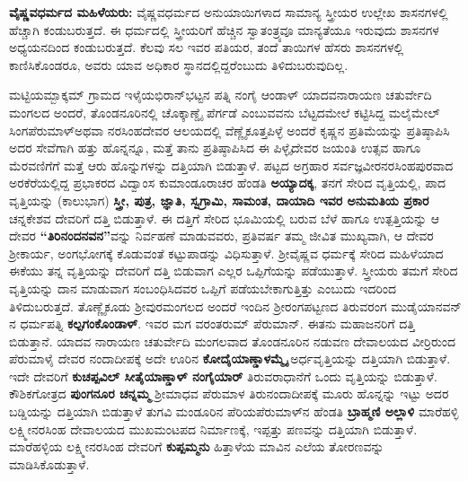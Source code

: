 \textbf{ವೈಷ್ಣವಧರ್ಮದ ಮಹಿಳೆಯರು:} ವೈಷ್ಣವಧರ್ಮದ ಅನುಯಾಯಿಗಳಾದ ಸಾಮಾನ್ಯ ಸ್ತ್ರೀಯರ ಉಲ್ಲೇಖ ಶಾಸನಗಳಲ್ಲಿ ಹೆಚ್ಚಾಗಿ ಕಂಡುಬರುತ್ತದೆ. ಈ ಧರ್ಮದಲ್ಲಿ ಸ್ತ್ರೀಯರಿಗೆ ಹೆಚ್ಚಿನ ಸ್ವಾತಂತ್ರ್ಯವೂ ಮಾನ್ಯತೆಯೂ ಇರುವುದು ಶಾಸನಗಳ ಅಧ್ಯಯನದಿಂದ ಕಂಡುಬರುತ್ತದೆ. ಕೆಲವು ಸಲ ಇವರ ಪತಿಯರ, ತಂದೆ ತಾಯಿಗಳ ಹೆಸರು ಶಾಸನಗಳಲ್ಲಿ ಕಾಣಿಸಿಕೊಂಡರೂ, ಅವರು ಯಾವ ಅಧಿಕಾರ ಸ್ಥಾನದಲ್ಲಿದ್ದರೆಂಬುದು ತಿಳಿದುಬರುವುದಿಲ್ಲ.

ಮಟ್ಟಿಯಮ್ಬಾಕ್ಕಮ್ ಗ್ರಾಮದ ಇಳೈಯಭಿರಾನ್​ಭಟ್ಟನ ಪತ್ನಿ ನಂಗೈ ಆಂಡಾಳ್​ ಯಾದವನಾರಾಯಣ ಚತುರ್ವೇದಿ ಮಂಗಲದ ಅಂದರೆ, ತೊಂಡನೂರಿನಲ್ಲಿ ಚೊಕ್ಕಾಣ್ಡೈ ಪೆರ್ಗಡೆ ಎಂಬುವವನು ಬೆಟ್ಟದಮೇಲೆ ಕಟ್ಟಿಸಿದ್ದ ಮಲೈಮೇಲ್​\break ಸಿಂಗಪೆರುಮಾಳ್​ ಅಥವಾ ನರಸಿಂಹದೇವರ ಆಲಯದಲ್ಲಿ ವೆಣ್ಣೈಕೂತ್ತಪಿಳ್ಳೆ ಅಂದರೆ ಕೃಷ್ಣನ ಪ್ರತಿಮೆಯನ್ನು ಪ್ರತಿಷ್ಠಾಪಿಸಿ ಅದರ ಸೇವೆಗಾಗಿ ಹತ್ತು ಹೊನ್ನನ್ನೂ, ಮತ್ತೆ ತಾನು ಪ್ರತಿಷ್ಠಾಪಿಸಿದ ಈ ಪಿಳ್ಳೈದೇವರ ಜಯಂತಿ ಉತ್ಸವ ಹಾಗೂ ಮೆರವಣಿಗೆಗೆ ಮತ್ತೆ ಆರು ಹೊನ್ನುಗಳನ್ನು ದತ್ತಿಯಾಗಿ ಬಿಡುತ್ತಾಳೆ. ಪಟ್ಟದ ಅಗ್ರಹಾರ ಸರ್ವಜ್ಞವೀರನರಸಿಂಹಪುರವಾದ ಅರಕೆರೆಯಲ್ಲಿದ್ದ ಪ್ರಭಾಕರದ ವಿದ್ವಾಂಸ ಕುಮಾಂಡೂರಾಚರ ಹೆಂಡತಿ \textbf{ಅಯ್ಯಾದಕ್ಕ}, ತನಗೆ ಸೇರಿದ ವೃತ್ತಿಯಲ್ಲಿ, ಪಾದ ವೃತ್ತಿಯನ್ನು (ಕಾಲುಭಾಗ) \textbf{ಸ್ತ್ರೀ, ಪುತ್ರ, ಜ್ಞಾತಿ, ಸ್ವಗ್ರಾಮಿ, ಸಾಮಂತ, ದಾಯಾದಿ ಇವರ ಅನುಮತಿಯ ಪ್ರಕಾರ} ಚನ್ನಕೇಶವ ದೇವರಿಗೆ ದತ್ತಿ ಬಿಡುತ್ತಾಳೆ. ಈ ದತ್ತಿಗೆ ಸೇರಿದ ಭೂಮಿಯಲ್ಲಿ ಬರುವ ಬೆಳೆ ಹಾಗೂ ಉತ್ಪತ್ತಿಯನ್ನು ಆ ದೇವರ \textbf{“ತಿರಿನಂದನವನ”}ವನ್ನು ನಿರ್ವಹಣೆ ಮಾಡುವವರು, ಪ್ರತಿವರ್ಷ ತಮ್ಮ ಜೀವಿತ ಮುಖ್ಯವಾಗಿ, ಆ ದೇವರ ಶ‍್ರೀಕಾರ್ಯ, ಅಂಗಭೋಗಕ್ಕೆ ಕೊಡುವಂತೆ ಕಟ್ಟುಪಾಡನ್ನು ವಿಧಿಸುತ್ತಾಳೆ. ಶ‍್ರೀವೈಷ್ಣವ ಧರ್ಮಕ್ಕೆ ಸೇರಿದ ಮಹಿಳೆಯಾದ ಈಕೆಯು ತನ್ನ ವೃತ್ತಿಯನ್ನು ದೇವರಿಗೆ ದತ್ತಿ ಬಿಡುವಾಗ ಎಲ್ಲರ ಒಪ್ಪಿಗೆಯನ್ನು ಪಡೆಯುತ್ತಾಳೆ. ಸ್ತ್ರೀಯರು ತಮಗೆ ಸೇರಿದ ವೃತ್ತಿಯನ್ನು ದಾನ ಮಾಡುವಾಗ ಸಂಬಂಧಿಸಿದವರ ಒಪ್ಪಿಗೆ ಪಡೆಯಬೇಕಾಗುತ್ತಿತ್ತು ಎಂಬುದು ಇದರಿಂದ ತಿಳಿದುಬರುತ್ತದೆ. ತೊಣ್ಣೈಕೂಡು ಶ‍್ರೀವುರಮಂಗಲದ ಅಂದರೆ ಇಂದಿನ ಶ‍್ರೀರಂಗಪಟ್ಟಣದ ತಿರುವರಂಗ ಮುಡೈಯಾನವನ್​ನ ಧರ್ಮಪತ್ನಿ \textbf{ಕಲ್ಪಗಂಕೊಂಡಾಳ್​}. ಇವರ ಮಗ ವರಂತರುಮ್ ಪೆರುಮಾನ್​. ಈತನು ಮಹಾಜನರಿಗೆ ದತ್ತಿ ಬಿಡುತ್ತಾನೆ. ಯಾದವ ನಾರಾಯಣ ಚತುರ್ವೇದಿ ಮಂಗಲವಾದ ತೊಂಡನೂರಿನ ನಡುವಣ ದೇವಾಲಯದ ವೀರ್ರಿರುಂದ ಪೆರುಮಾಳೈ ದೇವರ ನಂದಾದೀಪಕ್ಕೆ ಅದೇ ಊರಿನ \textbf{ಕೋದೈಯಾಣ್ಡಾಳಮ್ಮೈ} ಅರ್ಧವೃತ್ತಿಯನ್ನು ದತ್ತಿಯಾಗಿ ಬಿಡುತ್ತಾಳೆ. ಇದೇ ದೇವರಿಗೆ \textbf{ಕುಚಪ್ಪವಿಲ್​ ಸೀತೈಯಾಣ್ಡಾಳ್​ ನಂಗೈಯಾರ್​} ತಿರುವರಾಧಾನೆಗೆ ಒಂದು ವೃತ್ತಿಯನ್ನು ಬಿಡುತ್ತಾಳೆ. ಕೌಶಿಕಗೋತ್ರದ \textbf{ಪುಂಗನೂರ ಚನ್ನಮ್ಮ} ಶ‍್ರೀಮಾಧವ ಪೆರುಮಾಳ ತಿರುನಂದಾದೀಪಕ್ಕೆ ಮೂರು ಹೊನ್ನನ್ನು ಇಟ್ಟು ಅದರ ಬಡ್ಡಿಯನ್ನು ದತ್ತಿಯಾಗಿ ಬಿಡುತ್ತಾಳೆ ತುಗವಿ ಮಂಡೂರಿನ ಪೆರಿಯಪೆರುಮಾಳ್​ನ ಹೆಂಡತಿ \textbf{ಬ್ರಾಹ್ಮಣಿ ಅಲ್ಲಾಳಿ} ಮಾರೆಹಳ್ಳಿ ಲಕ್ಷ್ಮೀನರಸಿಂಹ ದೇವಾಲಯದ ಮುಖಮಂಟಪದ ನಿರ್ಮಾಣಕ್ಕೆ, ಇಪ್ಪತ್ತು ಪಣವನ್ನು ದತ್ತಿಯಾಗಿ ಬಿಡುತ್ತಾಳೆ. ಮಾರೆಹಳ್ಳಿಯ ಲಕ್ಷ್ಮೀನರಸಿಂಹ ದೇವರಿಗೆ \textbf{ಕುಪ್ಪಮ್ಮನು} ಹಿತ್ತಾಳೆಯ ಮಾವಿನ ಎಲೆಯ ತೋರಣವನ್ನು ಮಾಡಿಸಿಕೊಡುತ್ತಾಳೆ.

